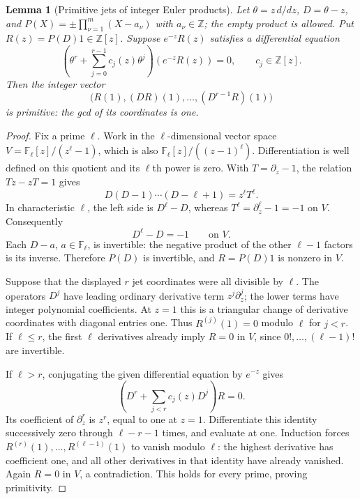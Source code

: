 \documentclass[11pt,a4paper]{article}
\newtheorem{lemma}[theorem]{Lemma}
\theoremstyle{definition}
\theoremstyle{remark}
\numberwithin{equation}{section}
\begin{document}
\begin{lemma}[Primitive jets of integer Euler products]
\label{p5:lem:primitive-euler-jet}
Let $\theta=z\,d/dz$, $D=\theta-z$, and
$P(X)=\pm\prod_{\nu=1}^m(X-a_\nu)$ with $a_\nu\in\mathbb Z$;
the empty product is allowed. Put $R(z)=P(D)1\in\mathbb Z[z]$.
Suppose $e^{-z}R(z)$ satisfies a differential equation
\[
 \left(\theta^r+\sum_{j=0}^{r-1}c_j(z)\theta^j\right)
       (e^{-z}R(z))=0,\qquad c_j\in\mathbb Z[z].
\]
Then the integer vector
\[
 \bigl(R(1),(DR)(1),\ldots,(D^{r-1}R)(1)\bigr)
\]
is primitive: the gcd of its coordinates is one.
\end{lemma}
\begin{proof}
Fix a prime $\ell$. Work in the $\ell$-dimensional vector space
$V=\mathbb F_\ell[z]/(z^\ell-1)$, which is also
$\mathbb F_\ell[z]/((z-1)^\ell)$. Differentiation is well defined on
this quotient and its $\ell$th power is zero. With $T=\partial_z-1$,
the relation $Tz-zT=1$ gives
\[
 D(D-1)\cdots(D-\ell+1)=z^\ell T^\ell.
\]
In characteristic $\ell$, the left side is $D^\ell-D$, whereas
$T^\ell=\partial_z^\ell-1=-1$ on $V$. Consequently
\[
 D^\ell-D=-1\qquad\text{on }V.
\]
Each $D-a$, $a\in\mathbb F_\ell$, is invertible: the negative product
of the other $\ell-1$ factors is its inverse. Therefore $P(D)$ is
invertible, and $R=P(D)1$ is nonzero in $V$.

Suppose that the displayed $r$ jet coordinates were all divisible by
$\ell$. The operators $D^j$ have leading ordinary derivative term
$z^j\partial_z^j$; the lower terms have integer polynomial coefficients.
At $z=1$ this is a triangular change of derivative coordinates with
diagonal entries one. Thus $R^{(j)}(1)=0$ modulo $\ell$ for $j<r$.
If $\ell\le r$, the first $\ell$ derivatives already imply
$R=0$ in $V$, since $0!,\ldots,(\ell-1)!$ are invertible.

If $\ell>r$, conjugating the given differential equation by $e^{-z}$
gives
\[
 \left(D^r+\sum_{j<r}c_j(z)D^j\right)R=0.
\]
Its coefficient of $\partial_z^r$ is $z^r$, equal to one at $z=1$.
Differentiate this identity successively zero through $\ell-r-1$
times, and evaluate at one. Induction forces
$R^{(r)}(1),\ldots,R^{(\ell-1)}(1)$ to vanish modulo $\ell$:
the highest derivative has coefficient one, and all other derivatives
in that identity have already vanished. Again $R=0$ in $V$, a
contradiction. This holds for every prime, proving primitivity.
\end{proof}
\end{document}
